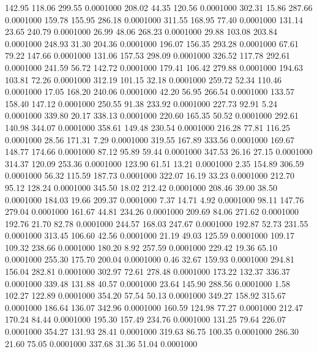  142.95  118.06  299.55   0.0001000
 208.02   44.35  120.56   0.0001000
 302.31   15.86  287.66   0.0001000
 159.78  155.95  286.18   0.0001000
 311.55  168.95   77.40   0.0001000
 131.14   23.65  240.79   0.0001000
  26.99   48.06  268.23   0.0001000
  29.88  103.08  203.84   0.0001000
 248.93   31.30  204.36   0.0001000
 196.07  156.35  293.28   0.0001000
  67.61   79.22  147.66   0.0001000
 131.06  157.53  298.09   0.0001000
 326.52  117.78  292.61   0.0001000
 241.59   56.72  142.72   0.0001000
 179.41  106.42  279.88   0.0001000
 194.63  103.81   72.26   0.0001000
 312.19  101.15   32.18   0.0001000
 259.72   52.34  110.46   0.0001000
  17.05  168.20  240.06   0.0001000
  42.20   56.95  266.54   0.0001000
 133.57  158.40  147.12   0.0001000
 250.55   91.38  233.92   0.0001000
 227.73   92.91    5.24   0.0001000
 339.80   20.17  338.13   0.0001000
 220.60  165.35   50.52   0.0001000
 292.61  140.98  344.07   0.0001000
 358.61  149.48  230.54   0.0001000
 216.28   77.81  116.25   0.0001000
  28.56  171.31    7.29   0.0001000
 319.55  167.89  333.56   0.0001000
 169.67  148.77  174.66   0.0001000
  87.12   95.89   59.44   0.0001000
 347.53   26.16   27.15   0.0001000
 314.37  120.09  253.36   0.0001000
 123.90   61.51   13.21   0.0001000
   2.35  154.89  306.59   0.0001000
  56.32  115.59  187.73   0.0001000
 322.07   16.19   33.23   0.0001000
 212.70   95.12  128.24   0.0001000
 345.50   18.02  212.42   0.0001000
 208.46   39.00   38.50   0.0001000
 184.03   19.66  209.37   0.0001000
   7.37   14.71    4.92   0.0001000
  98.11  147.76  279.04   0.0001000
 161.67   44.81  234.26   0.0001000
 209.69   84.06  271.62   0.0001000
 192.76   21.70   82.78   0.0001000
 244.57  168.03  247.67   0.0001000
 192.87   52.73  231.55   0.0001000
 313.45  106.60   42.56   0.0001000
  21.19   49.03  125.59   0.0001000
 109.17  109.32  238.66   0.0001000
 180.20    8.92  257.59   0.0001000
 229.42   19.36   65.10   0.0001000
 255.30  175.70  200.04   0.0001000
   0.46   32.67  159.93   0.0001000
 294.81  156.04  282.81   0.0001000
 302.97   72.61  278.48   0.0001000
 173.22  132.37  336.37   0.0001000
 339.48  131.88   40.57   0.0001000
  23.64  145.90  288.56   0.0001000
   1.58  102.27  122.89   0.0001000
 354.20   57.54   50.13   0.0001000
 349.27  158.92  315.67   0.0001000
 186.64  136.07  342.96   0.0001000
 160.59  124.98   77.27   0.0001000
 212.47  170.24   84.44   0.0001000
 195.30  157.49  234.76   0.0001000
 131.25   79.64  226.07   0.0001000
 354.27  131.93   28.41   0.0001000
 319.63   86.75  100.35   0.0001000
 286.30   21.60   75.05   0.0001000
 337.68   31.36   51.04   0.0001000
